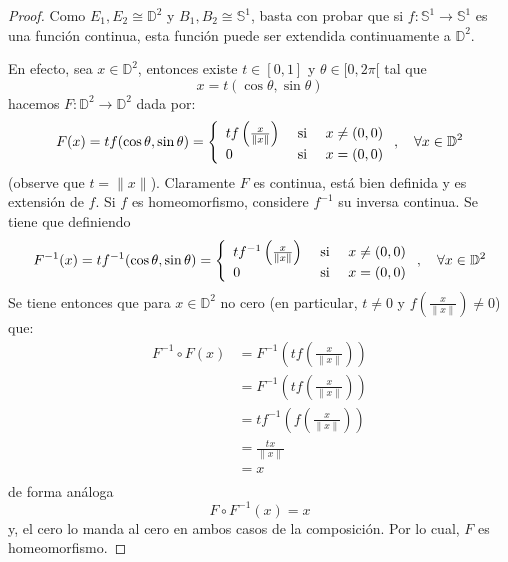 \documentclass[12pt]{report}
\theoremstyle{largebreak}
\newcommand\cf[3]{\ensuremath{#1:#2\rightarrow#3}}
\begin{document}
    \begin{proof}
        Como $E_1,E_2\cong\mathbb{D}^2$ y $B_1,B_2\cong\mathbb{S}^1$, basta con probar que si $\cf{f}{\mathbb{S}^1}{\mathbb{S}^1}$ es una función continua, esta función puede ser extendida continuamente a $\mathbb{D}^2$.

        En efecto, sea $x\in\mathbb{D}^2$, entonces existe $t\in[0,1]$ y $\theta\in[0,2\pi[$ tal que
        \begin{equation*}
            x=t(\cos\theta,\sin\theta)
        \end{equation*}
        hacemos $\cf{F}{\mathbb{D}^2}{\mathbb{D}^2}$ dada por:
        \begin{equation*}
            F(x)=tf(\cos\theta,\sin\theta)=\left\{
                \begin{array}{lcr}
                    tf\left(\frac{x}{\|x\|}\right) & \textup{ si } & x\neq(0,0)\\
                    0 & \textup{ si } & x=(0,0)\\
                \end{array}
            \right.,\quad\forall x\in\mathbb{D}^2
        \end{equation*}
        (observe que $t=\|x\|$). Claramente $F$ es continua, está bien definida y es extensión de $f$. Si $f$ es homeomorfismo, considere $f^{-1}$ su inversa continua. Se tiene que definiendo
        \begin{equation*}
            F^{-1}(x)=tf^{-1}(\cos\theta,\sin\theta)=\left\{
                \begin{array}{lcr}
                    tf^{-1}\left(\frac{x}{\|x\|}\right) & \textup{ si } & x\neq(0,0)\\
                    0 & \textup{ si } & x=(0,0)\\
                \end{array}
            \right.,\quad\forall x\in\mathbb{D}^2
        \end{equation*}
        Se tiene entonces que para $x\in\mathbb{D}^2$ no cero (en particular, $t\neq 0$ y $f\left(\frac{x}{\|x\|}\right)\neq0$) que:
        \begin{equation*}
            \begin{split}
                F^{-1}\circ F(x)&=F^{-1}\left(tf\left(\frac{x}{\|x\|}\right)\right)\\
                &=F^{-1}\left(tf\left(\frac{x}{\|x\|}\right)\right)\\
                &=t f^{-1}\left(f\left(\frac{x}{\|x\|}\right)\right)\\
                &=\frac{tx}{\|x\|}\\
                &=x\\
            \end{split}
        \end{equation*}
        de forma análoga
        \begin{equation*}
            F\circ F^{-1}(x)=x
        \end{equation*}
        y, el cero lo manda al cero en ambos casos de la composición. Por lo cual, $F$ es homeomorfismo.
    \end{proof}
\end{document}
